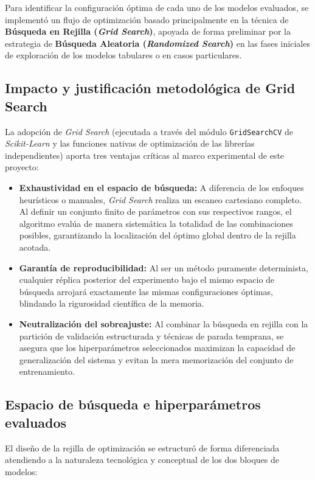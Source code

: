 \documentclass[12pt,a4paper,onecolumn,oneside]{report}
\begin{document}
Para identificar la configuración óptima de cada uno de los modelos evaluados, se implementó un flujo de optimización basado principalmente en la técnica de \textbf{Búsqueda en Rejilla (\textit{Grid Search})}, apoyada de forma preliminar por la estrategia de \textbf{Búsqueda Aleatoria (\textit{Randomized Search})} en las fases iniciales de exploración de los modelos tabulares o en casos particulares.

\subsection{Impacto y justificación metodológica de Grid Search}

La adopción de \textit{Grid Search} (ejecutada a través del módulo \texttt{GridSearchCV} de \textit{Scikit-Learn} y las funciones nativas de optimización de las librerías independientes) aporta tres ventajas críticas al marco experimental de este proyecto:

\begin{itemize}
    \item \textbf{Exhaustividad en el espacio de búsqueda:} A diferencia de los enfoques heurísticos o manuales, \textit{Grid Search} realiza un escaneo cartesiano completo. Al definir un conjunto finito de parámetros con sus respectivos rangos, el algoritmo evalúa de manera sistemática la totalidad de las combinaciones posibles, garantizando la localización del óptimo global dentro de la rejilla acotada.
    \item \textbf{Garantía de reproducibilidad:} Al ser un método puramente determinista, cualquier réplica posterior del experimento bajo el mismo espacio de búsqueda arrojará exactamente las mismas configuraciones óptimas, blindando la rigurosidad científica de la memoria.
    \item \textbf{Neutralización del sobreajuste:} Al combinar la búsqueda en rejilla con la partición de validación estructurada y técnicas de parada temprana, se asegura que los hiperparámetros seleccionados maximizan la capacidad de generalización del sistema y evitan la mera memorización del conjunto de entrenamiento.
\end{itemize}

\subsection{Espacio de búsqueda e hiperparámetros evaluados}

El diseño de la rejilla de optimización se estructuró de forma diferenciada atendiendo a la naturaleza tecnológica y conceptual de los dos bloques de modelos:
\end{document}
